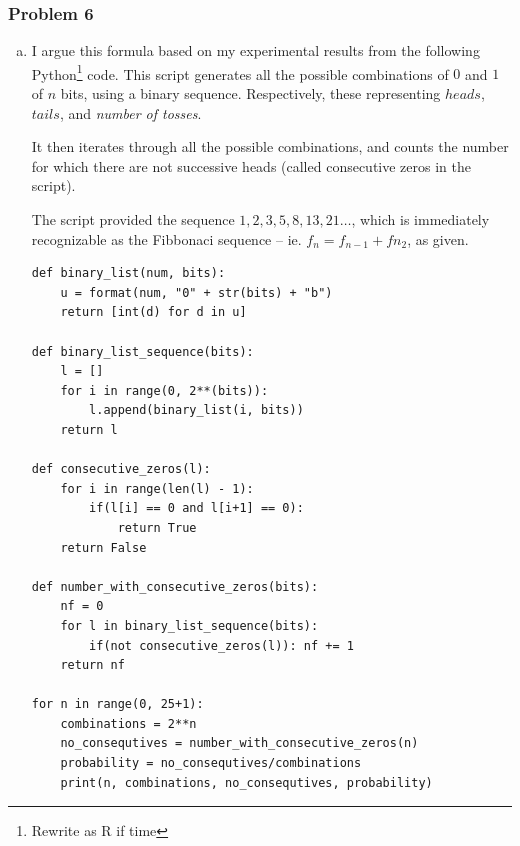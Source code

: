 \documentclass[11pt]{extarticle}
\begin{document}
\clearpage 
\subsubsection*{Problem 6}

\begin{enumerate}[(a)]

\item I argue this formula based on my experimental results from the following Python\footnote{Rewrite as R if time} code. This script generates all the possible combinations of $0$ and $1$ of $n$ bits, using a binary sequence. Respectively, these representing $heads$, $tails$, and \textit{number of tosses}. 

It then iterates through all the possible combinations, and counts the number for which there are not successive heads (called consecutive zeros in the script).

The script provided the sequence $1, 2, 3, 5, 8, 13, 21 \dots$, which is immediately recognizable as the Fibbonaci sequence -- ie. $f_n = f_{n-1} + f{n_2}$, as given.

\scriptsize
\begin{verbatim}def binary_list(num, bits):
    u = format(num, "0" + str(bits) + "b")
    return [int(d) for d in u] 

def binary_list_sequence(bits):
    l = []
    for i in range(0, 2**(bits)):
        l.append(binary_list(i, bits))
    return l

def consecutive_zeros(l):
    for i in range(len(l) - 1):
        if(l[i] == 0 and l[i+1] == 0):
            return True
    return False

def number_with_consecutive_zeros(bits):
    nf = 0
    for l in binary_list_sequence(bits):
        if(not consecutive_zeros(l)): nf += 1
    return nf
 
for n in range(0, 25+1):
    combinations = 2**n
    no_consequtives = number_with_consecutive_zeros(n)
    probability = no_consequtives/combinations    
    print(n, combinations, no_consequtives, probability)
\end{verbatim}
\normalsize



\end{enumerate}
\end{document}

